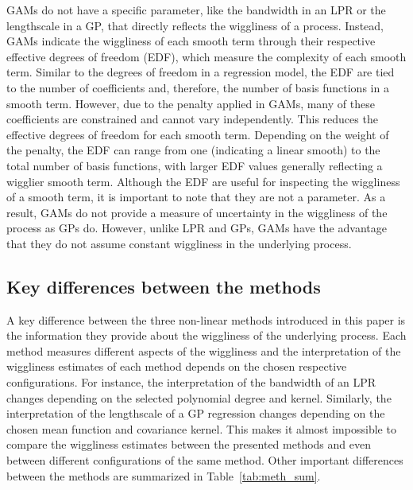 \documentclass[man, floatsintext]{apa7}
\begin{document}
GAMs do not have a specific parameter, like the bandwidth in an LPR or the
lengthscale in a GP, that directly reflects the wiggliness of a process.
Instead, GAMs indicate the wiggliness of each smooth term through their
respective effective degrees of freedom (EDF), which measure the complexity of
each smooth term. Similar to the degrees of freedom in a regression model, the
EDF are tied to the number of coefficients and, therefore, the number of basis
functions in a smooth term. However, due to the penalty applied in GAMs, many
of these coefficients are constrained and cannot vary independently. This
reduces the effective degrees of freedom for each smooth term. Depending on the
weight of the penalty, the EDF can range from one (indicating a linear smooth)
to the total number of basis functions, with larger EDF values generally
reflecting a wigglier smooth term. Although the EDF are useful for inspecting
the wiggliness of a smooth term, it is important to note that they are not a
parameter. As a result, GAMs do not provide a measure of uncertainty in the
wiggliness of the process as GPs do. However, unlike LPR and GPs, GAMs have the
advantage that they do not assume constant wiggliness in the underlying
process.

\subsection{Key differences between the methods}

A key difference between the three non-linear methods introduced in this paper
is the information they provide about the wiggliness of the underlying process.
Each method measures different aspects of the wiggliness and the interpretation
of the wiggliness estimates of each method depends on the chosen respective
configurations. For instance, the interpretation of the bandwidth of an LPR
changes depending on the selected polynomial degree and kernel. Similarly, the
interpretation of the lengthscale of a GP regression changes depending on the
chosen mean function and covariance kernel. This makes it almost impossible to
compare the wiggliness estimates between the presented methods and even between
different configurations of the same method. Other important differences
between the methods are summarized in Table~\ref{tab:meth_sum}.
\end{document}
